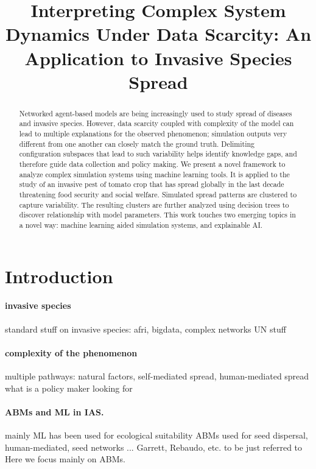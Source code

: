 \documentclass{article}
\title{Interpreting Complex System Dynamics Under Data Scarcity: An
Application to Invasive Species Spread}
\begin{document}
\maketitle

\begin{abstract}
Networked agent-based models are being increasingly used to study spread of
diseases and invasive species. However, data scarcity coupled with
complexity of the model can lead to multiple explanations for the observed
phenomenon; simulation outputs very different from one another can closely
match the ground truth. Delimiting configuration subspaces that lead to
such variability helps identify knowledge gaps, and therefore guide data
collection and policy making. We present a novel framework to analyze
complex simulation systems using machine learning tools. It is applied to
the study of an invasive pest of tomato crop that has spread globally in
the last decade threatening food security and social welfare. Simulated
spread patterns are clustered to capture variability. The resulting
clusters are further analyzed using decision trees to discover relationship
with model parameters. This work touches two emerging topics in a novel
way: machine learning aided simulation systems, and explainable AI.
\end{abstract}

\section{Introduction}
\paragraph{invasive species} standard stuff on invasive species: afri, bigdata, complex networks
UN stuff

\paragraph{complexity of the phenomenon} 
multiple pathways: natural factors, self-mediated spread, human-mediated spread
what is a policy maker looking for

\paragraph{ABMs and ML in IAS.}
mainly ML has been used for ecological suitability
ABMs used for seed dispersal, human-mediated, seed networks ...
Garrett, Rebaudo, etc. to be just referred to
Here we focus mainly on ABMs.
\end{document}
